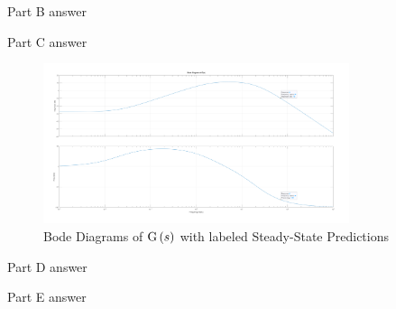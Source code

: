 \begin{hwkProblem}{3}{}
	\hwkPart{}
	
	Part B answer

	\hwkPart{}

	Part C answer

	\begin{figure}[H]
		\begin{center}
			\includegraphics[width=0.8\textwidth]{./images/s03c.png}
		\end{center}
		\caption{Bode Diagrams of \( \func{G}[s] \) with labeled Steady-State Predictions}\label{fig:s03c}
	\end{figure}

	\hwkPart{}

	Part D answer

	\hwkPart{}

	Part E answer

\end{hwkProblem}

